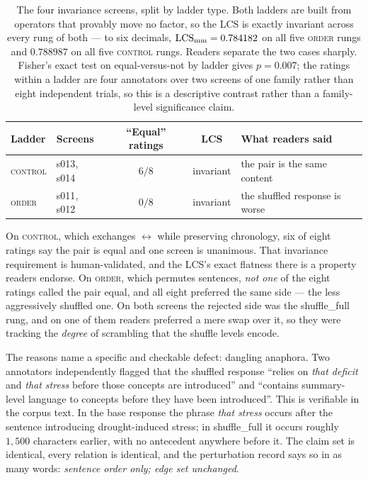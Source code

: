\begin{table}[tbp]
\centering\small
\caption{The four invariance screens, split by ladder type. Both ladders are built from operators that
  provably move no factor, so the LCS is exactly invariant across every rung of both --- to six
  decimals, $\mathrm{LCS}_{\mathrm{mm}}=0.784182$ on all five \textsc{order} rungs and $0.788987$ on all five
  \textsc{control} rungs. Readers separate the two cases sharply. Fisher's exact test on
  equal-versus-not by ladder gives $p=0.007$; the ratings within a ladder are four annotators over two
  screens of one family rather than eight independent trials, so this is a descriptive contrast rather
  than a family-level significance claim.}
\label{tab:human}
\begin{tabular}{@{}llccl@{}}
\toprule
Ladder & Screens & ``Equal'' ratings & LCS & What readers said \\
\midrule
\textsc{control} & \textsf{s013}, \textsf{s014} & $6/8$ & invariant & the pair is the same content \\
\textsc{order}   & \textsf{s011}, \textsf{s012} & $0/8$ & invariant & the shuffled response is worse \\
\bottomrule
\end{tabular}
\end{table}

On \textsc{control}, which exchanges $\leftrightarrow$ while
preserving chronology, six of eight ratings say the pair is equal and one screen is unanimous. That
invariance requirement is human-validated, and the LCS's exact flatness there is a property readers
endorse. On \textsc{order}, which permutes sentences, \emph{not one} of the eight ratings called the
pair equal, and all eight preferred the same side --- the less aggressively shuffled one. On both
screens the rejected side was the \textsf{shuffle\_full} rung, and on one of them readers preferred a
mere  swap over it, so they were tracking the \emph{degree} of scrambling that the
shuffle levels encode.

The reasons name a specific and checkable defect: dangling anaphora. Two annotators independently
flagged that the shuffled response ``relies on \emph{that deficit} and \emph{that stress} before those
concepts are introduced'' and ``contains summary-level language to concepts before they have been
introduced''. This is verifiable in the corpus text. In the base response the phrase \emph{that stress}
occurs after the sentence introducing drought-induced stress; in \textsf{shuffle\_full} it occurs
roughly $1{,}500$ characters earlier, with no antecedent anywhere before it. The claim set is
identical, every relation is identical, and the perturbation record says so in as many words:
\emph{sentence order only; edge set unchanged}.

